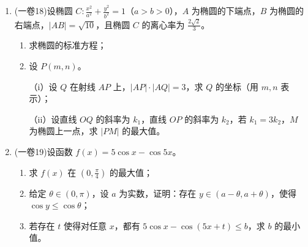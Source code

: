\documentclass[UTF8]{ctexart}
\begin{document}
\begin{enumerate}[leftmargin=*, label=\textbf{\arabic*.}]
	    \item (一卷18)设椭圆 $ C: \frac{x^2}{a^2} + \frac{y^2}{b^2} = 1 $（$ a > b > 0 $），$ A $ 为椭圆的下端点，$ B $ 为椭圆的右端点，$ |AB| = \sqrt{10} $，且椭圆 $ C $ 的离心率为 $ \frac{2\sqrt{2}}{3} $。
	\begin{enumerate}[label=(\arabic*)]
		\item 求椭圆的标准方程；
		\item 设 $ P(m, n) $。
		
		
		 （i）设 $ Q $ 在射线 $ AP $ 上，$ |AP| \cdot |AQ| = 3 $，求 $ Q $ 的坐标（用 $ m, n $ 表示）；
		
		 （ii）设直线 $ OQ $ 的斜率为 $ k_1 $，直线 $ OP $ 的斜率为 $ k_2 $，若 $ k_1 = 3k_2 $，$ M $ 为椭圆上一点，求 $ |PM| $ 的最大值。
		
	\end{enumerate}
	
	\item (一卷19)设函数 $ f(x) = 5\cos x - \cos 5x $。
	\begin{enumerate}[label=(\arabic*)]
		\item 求 $ f(x) $ 在 $ \left(0, \frac{\pi}{4}\right) $ 的最大值；
		\item 给定 $ \theta \in (0, \pi) $，设 $ a $ 为实数，证明：存在 $ y \in (a - \theta, a + \theta) $，使得 $ \cos y \leq \cos \theta $；
		\item 若存在 $ t $ 使得对任意 $ x $，都有 $ 5\cos x - \cos(5x + t) \leq b $，求 $ b $ 的最小值。
	\end{enumerate}
	\end{enumerate}
	
\end{document}
